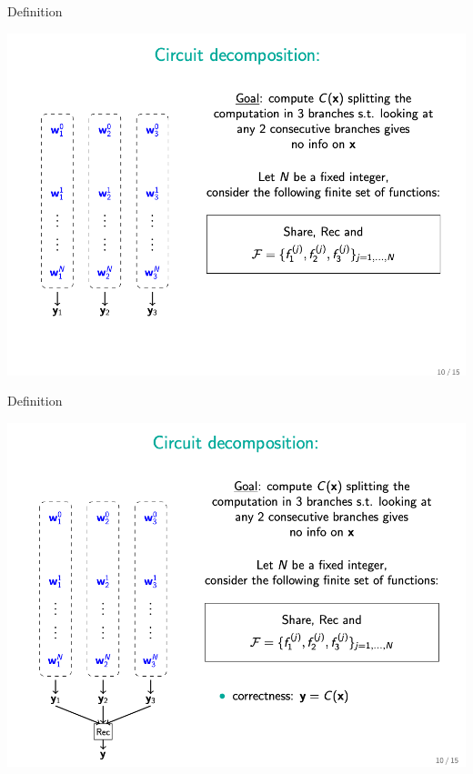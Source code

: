 \documentclass{beamer}
\begin{document}
\begin{frame}{Definition}
	\begin{minipage}{0.42\linewidth}
		\includegraphics[scale=0.4]{f16.png}
	\end{minipage}
\end{frame}












\begin{frame}{Definition}
	\begin{minipage}{0.42\linewidth}
		\includegraphics[scale=0.4]{f17.png}
	\end{minipage}
\end{frame}
\end{document}
